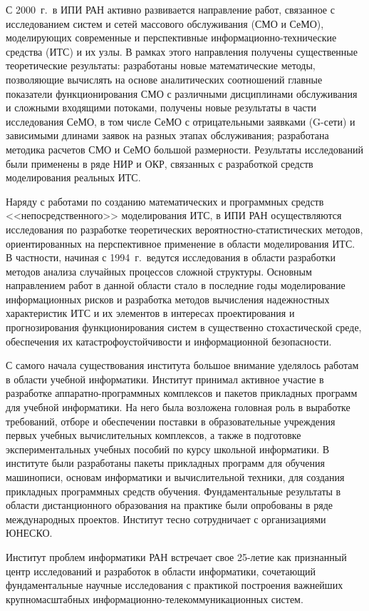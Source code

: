 \begin{multicols}{2}
    С 2000~г.\ в ИПИ РАН активно развивается направление работ,
связанное с исследованием сис\-тем и сетей массового обслуживания
(СМО и \mbox{СеМО}), моделирующих современные и перспективные информационно-технические средства (ИТС)
и их узлы. В рамках этого направления получены существенные
теоретические результаты: разработаны новые математические
методы, позволяющие вычислять на основе аналитических
соотношений главные показатели функционирования СМО с
различными дисциплинами обслуживания и сложными входящими
потоками, получены новые результаты в части исследования СеМО,
в том числе СеМО с отрицательными заявками (G-сети) и
зависимыми длинами заявок на разных этапах обслуживания;
разработана методика расчетов СМО и СеМО большой размерности.
Результаты исследований были применены в ряде НИР и ОКР,
связанных с разработкой средств моделирования реальных ИТС.

     Наряду с работами по созданию математических и
программных средств <<непосредственного>> моделирования ИТС,
в ИПИ РАН осуществляются исследования по разработке
теоретических ве\-роят\-но\-ст\-но-ста\-тис\-ти\-че\-ских методов,
ориентированных на перспективное применение в об\-ласти
моделирования ИТС. В частности, начиная с 1994~г.\ ведутся
исследования в области разработки методов анализа случайных
процессов сложной структуры. Основным направлением работ в
данной об\-ласти стало в последние годы моделирование
информационных рисков и разработка методов вычисления
надежностных характеристик ИТС и их элементов в интересах
проектирования и прогнозирования функционирования систем в
сущест\-венно стохастической среде, обеспечения их
катастрофоустойчивости и информационной безопасности.
{ %

}

     С самого начала существования института большое внимание
уделялось работам в области учебной информатики. Институт
принимал активное участие в разработке ап\-па\-рат\-но-про\-грам\-мных
комплек\-сов и пакетов прикладных программ для учебной
информатики. На него была возложена головная роль в выработке
требований, отборе и %
 обеспечении поставки в образовательные
учреждения первых учебных вычислительных комплексов, а также в
подготовке экспериментальных учебных пособий по курсу
школьной информатики. 
В институте были разработаны пакеты
прикладных программ для обучения машинописи, основам
информатики и вычислительной техники, для создания прикладных
программных средств обучения. 
%
Фундаментальные результаты в
области дистанционного образования на практике были опробованы
в ряде международных проектов. Институт тесно сотрудничает с
организациями ЮНЕСКО.
{ %

}


Институт проблем информатики РАН встречает свое 25-летие как признанный центр
исследований и разработок в об\-ласти информатики, сочетающий
фундаментальные научные исследования с практикой построения
важнейших крупномасштабных
     ин\-фор\-ма\-ци\-он\-но-те\-ле\-ком\-му\-ни\-ка\-ци\-он\-ных систем.
\label{end\stat}


\end{multicols}